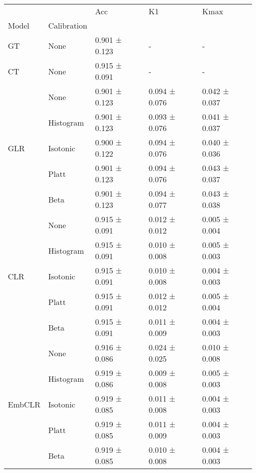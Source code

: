 \begin{tabular}{lllll}
\toprule
 &  & Acc & K1 & Kmax \\
Model & Calibration &  &  &  \\
\midrule
GT & None & 0.901 ± 0.123 & - & - \\
\cline{1-5}
CT & None & 0.915 ± 0.091 & - & - \\
\cline{1-5}
\multirow[t]{5}{*}{GLR} & None & 0.901 ± 0.123 & 0.094 ± 0.076 & 0.042 ± 0.037 \\
 & Histogram & 0.901 ± 0.123 & 0.093 ± 0.076 & 0.041 ± 0.037 \\
 & Isotonic & 0.900 ± 0.122 & 0.094 ± 0.076 & 0.040 ± 0.036 \\
 & Platt & 0.901 ± 0.123 & 0.094 ± 0.076 & 0.043 ± 0.037 \\
 & Beta & 0.901 ± 0.123 & 0.094 ± 0.077 & 0.043 ± 0.038 \\
\cline{1-5}
\multirow[t]{5}{*}{CLR} & None & 0.915 ± 0.091 & 0.012 ± 0.012 & 0.005 ± 0.004 \\
 & Histogram & 0.915 ± 0.091 & 0.010 ± 0.008 & 0.005 ± 0.003 \\
 & Isotonic & 0.915 ± 0.091 & 0.010 ± 0.008 & 0.004 ± 0.003 \\
 & Platt & 0.915 ± 0.091 & 0.012 ± 0.012 & 0.005 ± 0.004 \\
 & Beta & 0.915 ± 0.091 & 0.011 ± 0.009 & 0.004 ± 0.003 \\
\cline{1-5}
\multirow[t]{5}{*}{EmbCLR} & None & 0.916 ± 0.086 & 0.024 ± 0.025 & 0.010 ± 0.008 \\
 & Histogram & 0.919 ± 0.086 & 0.009 ± 0.008 & 0.005 ± 0.003 \\
 & Isotonic & 0.919 ± 0.085 & 0.011 ± 0.008 & 0.004 ± 0.003 \\
 & Platt & 0.919 ± 0.085 & 0.011 ± 0.009 & 0.004 ± 0.003 \\
 & Beta & 0.919 ± 0.085 & 0.010 ± 0.008 & 0.004 ± 0.003 \\
\cline{1-5}
\bottomrule
\end{tabular}
